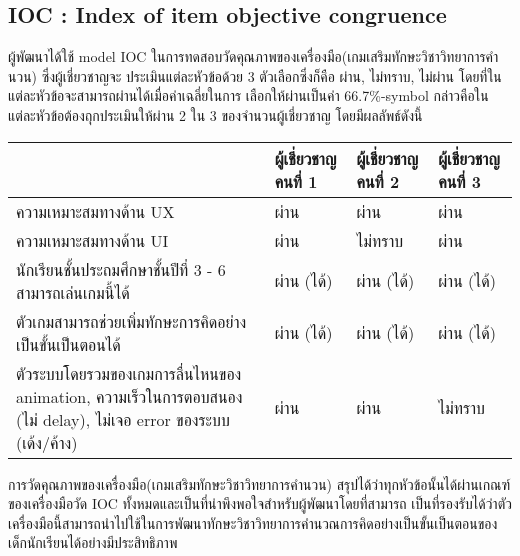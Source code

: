 \subsection{IOC : Index of item objective congruence}
ผู้พัฒนาได้ใช้ model IOC ในการทดสอบวัดคุณภาพของเครื่องมือ(เกมเสริมทักษะวิชาวิทยาการคำนวน) ซึ่งผู้เชี่ยวชาญจะ
ประเมินแต่ละหัวข้อด้วย 3 ตัวเลือกซึ่งก็คือ ผ่าน, ไม่ทราบ, ไม่ผ่าน โดยที่ในแต่ละหัวข้อจะสามารถผ่านได้เมื่อค่าเฉลี่ยในการ
เลือกให้ผ่านเป็นค่า 66.7\%-symbol กล่าวคือในแต่ละหัวข้อต้องถุกประเมินให้ผ่าน 2 ใน 3 ของจำนวนผู้เชี่ยวชาญ โดยมีผลลัพธ์ดังนี้
\begin{center}
    \begin{tabular}{ |p{3cm}|p{3cm}|p{3cm}|p{3cm}| }
        \hline
         & ผู้เชี่ยวชาญคนที่ 1 & ผู้เชี่ยวชาญคนที่ 2 & ผู้เชี่ยวชาญคนที่ 3\\
        \hline
        ความเหมาะสมทางด้าน UX & ผ่าน & ผ่าน & ผ่าน\\
        \hline
        ความเหมาะสมทางด้าน UI & ผ่าน & ไม่ทราบ & ผ่าน\\
        \hline
        นักเรียนชั้นประถมศึกษาชั้นปีที่ 3 - 6 สามารถเล่นเกมนี้ได้ & ผ่าน (ได้) & ผ่าน (ได้) & ผ่าน (ได้)\\
        \hline
        ตัวเกมสามารถช่วยเพิ่มทักษะการคิดอย่างเป็นขั้นเป็นตอนได้ & ผ่าน (ได้) & ผ่าน (ได้) & ผ่าน (ได้)\\
        \hline
        ตัวระบบโดยรวมของเกมการลื่นไหนของ animation, ความเร็วในการตอบสนอง (ไม่ delay), ไม่เจอ error ของระบบ (เด้ง/ค้าง) & ผ่าน & ผ่าน & ไม่ทราบ\\
        \hline
    \end{tabular}
\end{center}
การวัดคุณภาพของเครื่องมือ(เกมเสริมทักษะวิชาวิทยาการคำนวน) สรุปได้ว่าทุกหัวข้อนั้นได้ผ่านเกณฑ์ของเครื่องมือวัด IOC ทั้งหมดและเป็นที่น่าพึงพอใจสำหรับผู้พัฒนาโดยที่สามารถ
เป็นที่รองรับได้ว่าตัวเครื่องมือนี้สามารถนำไปใช้ในการพัฒนาทักษะวิชาวิทยาการคำนวณการคิดอย่างเป็นขั้นเป็นตอนของเด็กนักเรียนได้อย่างมีประสิทธิภาพ


